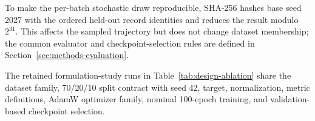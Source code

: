 To make the per-batch stochastic draw reproducible, SHA-256 hashes base seed 2027 with the ordered held-out record identities and reduces the result modulo $2^{31}$. This affects the sampled trajectory but does not change dataset membership; the common evaluator and checkpoint-selection rules are defined in Section~\ref{sec:methods-evaluation}.

The retained formulation-study runs in Table~\ref{tab:design-ablation} share the dataset family, 70/20/10 split contract with seed 42, target, normalization, metric definitions, AdamW optimizer family, nominal 100-epoch training, and validation-based checkpoint selection.
